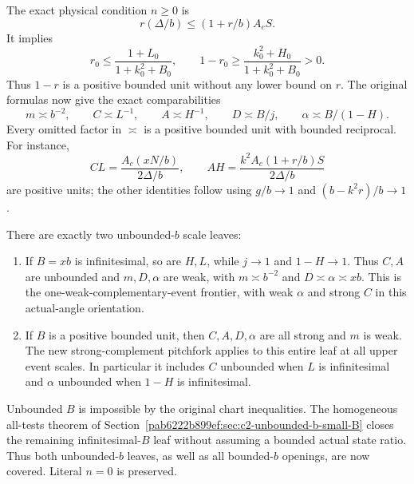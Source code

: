 The exact physical condition $n\ge0$ is
\[
 r(\Delta/b)\le(1+r/b)A_cS.
\]
It implies
\[
 r_0\le\frac{1+L_0}{1+k_0^2+B_0},\qquad
 1-r_0\ge\frac{k_0^2+H_0}{1+k_0^2+B_0}>0.
\]
Thus $1-r$ is a positive bounded unit without any lower bound on $r$.
The original formulas now give the exact comparabilities
\[
 m\asymp b^{-2},\qquad C\asymp L^{-1},\qquad A\asymp H^{-1},
 \qquad D\asymp B/j,\qquad\alpha\asymp B/(1-H).
 \tag{SR1}
\]
Every omitted factor in $\asymp$ is a positive bounded unit with
bounded reciprocal. For instance,
\[
 CL=\frac{A_c(xN/b)}{2\Delta/b},\qquad
 AH=\frac{k^2A_c(1+r/b)S}{2\Delta/b}
\]
are positive units; the other identities follow using $g/b\to1$
and $(b-k^2r)/b\to1$.

There are exactly two unbounded-$b$ scale leaves:
\begin{enumerate}
\item If $B=xb$ is infinitesimal, so are $H,L$, while $j\to1$
and $1-H\to1$. Thus $C,A$ are unbounded and $m,D,\alpha$ are
weak, with $m\asymp b^{-2}$ and $D\asymp\alpha\asymp xb$.
This is the one-weak-complementary-event frontier, with weak
$\alpha$ and strong $C$ in this actual-angle orientation.
\item If $B$ is a positive bounded unit, then $C,A,D,\alpha$
are all strong and $m$ is weak. The new strong-complement pitchfork
applies to this entire leaf at all upper event scales. In particular
it includes $C$ unbounded when $L$ is infinitesimal and $\alpha$
unbounded when $1-H$ is infinitesimal.
\end{enumerate}
Unbounded $B$ is impossible by the original chart inequalities.
The homogeneous all-tests theorem of Section~\ref{pab6222b899ef:sec:c2-unbounded-b-small-B}
closes the remaining infinitesimal-$B$ leaf without assuming a bounded
actual state ratio. Thus both unbounded-$b$ leaves, as well as all
bounded-$b$ openings, are now covered. Literal $n=0$ is preserved.
